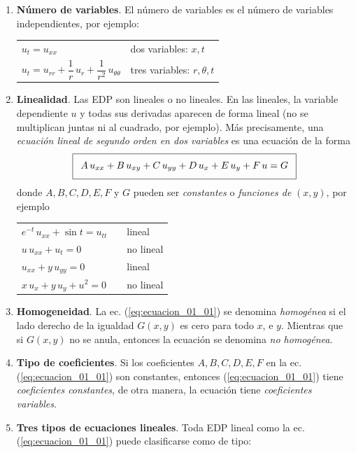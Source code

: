 \begin{enumerate}
\item \textbf{Número de variables}. El número de variables es el número de variables independientes, por ejemplo:
\begin{table}[H]
\centering
\large
\begin{tabular}{l l}
\Large{$u_{t} = u_{xx}$} & dos variables: $x, t$ \\
\Large{$u_{t} = u_{rr} + \dfrac{1}{r} \, u_{r} + \dfrac{1}{r^{2}} \, u_{\theta \theta}$} & tres variables: $r, \theta, t$
\end{tabular}
\end{table}
\item \textbf{Linealidad}. Las EDP son lineales o no lineales. En las lineales, la variable dependiente $u$ y todas sus derivadas aparecen de forma lineal (no se multiplican juntas ni al cuadrado, por ejemplo). Más precisamente, una \emph{ecuación lineal de segundo orden en dos variables} es una ecuación de la forma
\begin{align}
\addtolength{\fboxsep}{5pt}\boxed{ A \, u_{xx} + B \, u_{xy} + C \, u_{yy} + D \, u_{x} + E \, u_{y} + F \, u = G}
\label{eq:ecuacion_01_01}
\end{align}
donde $A, B, C, D, E, F$ y $G$ pueden ser \emph{constantes} o \emph{funciones de} $(x, y)$, por ejemplo
\begin{table}[H]
\centering
\large
\begin{tabular}{l p{1cm} l}
\Large{$e^{-t} \, u_{xx} + \sin t = u_{tt}$} & & lineal \\
\Large{$u \, u_{xx} + u_{t} = 0$} & & no lineal \\
\Large{$u_{xx} + y \, u_{yy} = 0$} & & lineal \\
\Large{$x \, u_{x} + y \, u_{y} + u^{2} = 0$} & & no lineal
\end{tabular}
\end{table}
\item \textbf{Homogeneidad}. La ec. (\ref{eq:ecuacion_01_01}) se denomina \emph{homogénea} si el lado derecho de la igualdad $G(x, y)$ es cero para todo $x$, e $y$. Mientras que si $G(x, y)$ no se anula, entonces la ecuación se denomina \emph{no homogénea}.
\item \textbf{Tipo de coeficientes}. Si los coeficientes $A, B, C, D, E, F$ en la ec. (\ref{eq:ecuacion_01_01}) son constantes, entonces (\ref{eq:ecuacion_01_01}) tiene \emph{coeficientes constantes}, de otra manera, la ecuación tiene \emph{coeficientes variables}.
\item \textbf{Tres tipos de ecuaciones lineales}. Toda EDP lineal como la ec. (\ref{eq:ecuacion_01_01}) puede clasificarse como de tipo:

\end{enumerate}
